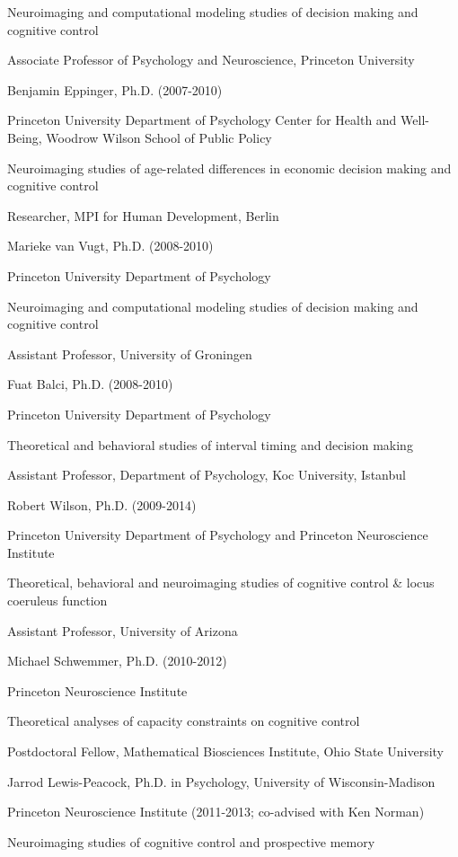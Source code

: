 \documentclass[10 pt]{article}
\begin{document}
Neuroimaging and computational modeling studies of decision making and cognitive control

Associate Professor of Psychology and Neuroscience, Princeton University
    \medskip

Benjamin Eppinger, Ph.D. (2007-2010)

Princeton University Department of Psychology
Center for Health and Well-Being, Woodrow Wilson School of Public Policy

Neuroimaging studies of age-related differences in economic decision making and cognitive control

Researcher, MPI for Human Development, Berlin
    \medskip

Marieke van Vugt, Ph.D. (2008-2010)

Princeton University Department of Psychology

Neuroimaging and computational modeling studies of decision making and cognitive control

Assistant Professor, University of Groningen
    \medskip

Fuat Balci, Ph.D. (2008-2010)

Princeton University Department of Psychology

Theoretical and behavioral studies of interval timing and decision making

Assistant Professor, Department of Psychology, Koc University, Istanbul
    \medskip

Robert Wilson, Ph.D. (2009-2014)

Princeton University Department of Psychology and Princeton Neuroscience Institute

Theoretical, behavioral and neuroimaging studies of cognitive control \& locus coeruleus function

Assistant Professor, University of Arizona
    \medskip

Michael Schwemmer, Ph.D. (2010-2012)

Princeton Neuroscience Institute

Theoretical analyses of capacity constraints on cognitive control

Postdoctoral Fellow, Mathematical Biosciences Institute, Ohio State University
    \medskip

Jarrod Lewis-Peacock, Ph.D. in Psychology, University of Wisconsin-Madison

Princeton Neuroscience Institute (2011-2013; co-advised with Ken Norman)

Neuroimaging studies of cognitive control and prospective memory
\end{document}
